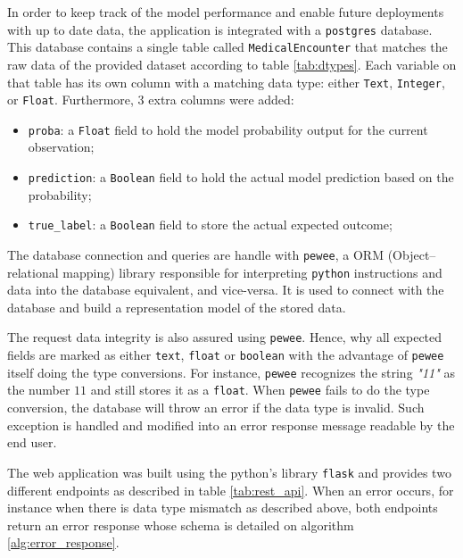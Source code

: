 \documentclass[a4paper,11pt]{article}
\begin{document}
In order to keep track of the model performance and enable future deployments with up to date data, the application is integrated with a \texttt{postgres} database. This database contains a single table called \texttt{MedicalEncounter} that matches the raw data of the provided dataset according to table \ref{tab:dtypes}. Each variable on that table has its own column with a matching data type: either \texttt{Text}, \texttt{Integer}, or \texttt{Float}.
Furthermore, 3 extra columns were added: 

\begin{itemize}
    \item \texttt{proba}: a \texttt{Float} field to hold the model probability output for the current observation;
    \item \texttt{prediction}: a \texttt{Boolean} field to hold the actual model prediction based on the probability;
    
    \item \texttt{true\_label}: a \texttt{Boolean} field to store the actual expected outcome;
\end{itemize}


The database connection and queries are handle with \texttt{pewee}, a ORM (Object–relational mapping) library responsible for interpreting \texttt{python} instructions and data into the database equivalent, and vice-versa. It is used to connect with the database and build a representation model of the stored data.

The request data integrity is also assured using \texttt{pewee}.  Hence, why all expected fields are marked as either \texttt{text}, \texttt{float} or \texttt{boolean} with the advantage of \texttt{pewee} itself doing the type conversions. For instance, \texttt{pewee} recognizes the string \textit{"11"} as the number $11$ and still stores it as a \texttt{float}. When \texttt{pewee} fails to do the type conversion, the database will throw an error if the data type is invalid. Such exception is handled and modified into an error response message readable by the end user.

The web application was built using the python's library \texttt{flask} and provides two different endpoints as described in table \ref{tab:rest_api}. When an error occurs, for instance when there is data type mismatch as described above, both endpoints return an error response whose schema is detailed on algorithm \ref{alg:error_response}.
\end{document}
